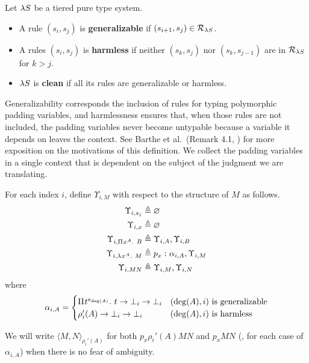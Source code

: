 \documentclass{article}
\begin{document}
\begin{definition}
Let $\lambda S$ be a tiered pure type system.
\begin{itemize}
    \item A rule $(s_i, s_j)$ is \textbf{generalizable} if $(s_{i + 1}, s_j) \in \mathcal R_{\lambda S}$.
    \item A rules $(s_i, s_j)$ is \textbf{harmless} if neither $(s_k, s_j)$ nor $(s_k, s_{j - 1})$ are in $\mathcal R_{\lambda S}$ for $k > j$.
    \item $\lambda S$ is \textbf{clean} if all its rules are generalizable or harmless.
\end{itemize}
\end{definition}

Generalizability corresponds the inclusion of rules for typing polymorphic padding variables, and harmlessness ensures that, when those rules are not included, the padding variables never become untypable because a variable it depends on leaves the context.
See Barthe et al.\ (Remark 4.1, \cite{barthe-et-al-2001}) for more exposition on the motivations of this definition.
We collect the padding variables in a single context that is dependent on the subject of the judgment we are translating.

\begin{definition}
For each index $i$, define $\Upsilon_{i, M}$ with respect to the structure of $M$ as follows.
\begin{align*}
    \Upsilon_{i, s_j} &\triangleq \varnothing \\
    \Upsilon_{i, x} &\triangleq \varnothing \\
    \Upsilon_{i, {\Pi^{} {x}^{A}. \ {B}}} &\triangleq \Upsilon_{i, A}, \Upsilon_{i, B} \\
    \Upsilon_{i, \lambda^{} x^{A}. \ M} &\triangleq {{p_x} :^{} {\alpha_{i, A}}}, \Upsilon_{i, M} \\
    \Upsilon_{i, MN} &\triangleq \Upsilon_{i, M}, \Upsilon_{i, N}
\end{align*}
where
\[
\alpha_{i, A} =
\begin{cases}
    {\Pi^{} {t}^{s_{\deg(A)}}. \ {t \to \bot_i \to \bot_i}} & \textnormal{$(\deg(A), i)$ is generalizable} \\
    \rho_i'(A) \to \bot_i \to \bot_i & \textnormal{$(\deg(A), i)$ is harmless}
\end{cases}
\]
\end{definition}

\newcommand{\pair}[3][]{\langle#2, #3\rangle_{#1}}
We will write $\pair[\rho_i'(A)] M N$ for both $p_x \rho_i'(A) M N$ and $p_x M N$ (\ie, for each case of $\alpha_{i , A}$) when there is no fear of ambiguity.
\end{document}
